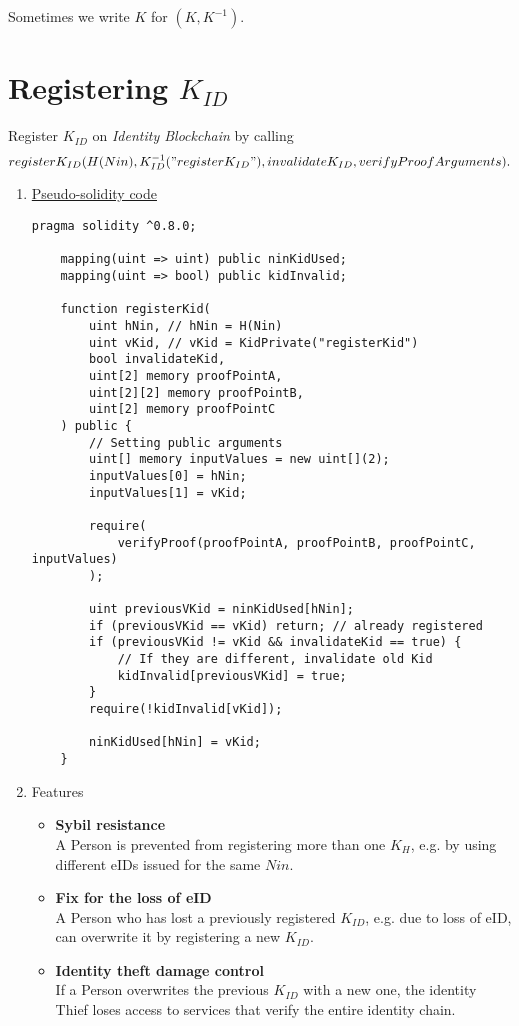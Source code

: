 \documentclass{article}
\newcommand{\khk}{K_{H}}
\newcommand{\kid}{K_{ID}}
\newcommand{\pbc}{\textit{Identity Blockchain}}
\begin{document}
Sometimes we write $K$ for $(K, K^{-1})$.

\newpage
\section{Registering $\kid$}
Register $\kid$ on \pbc{} by calling $$register\kid(H(Nin), \kid^{-1}("register\kid"), invalidate\kid, verifyProofArguments).$$
\begin{enumerate}[leftmargin=0cm]

	\item[] \underline{Pseudo-solidity code}

	\hfill\begin{minipage}{\dimexpr\textwidth-20px}
	\begin{lstlisting}[language=Solidity]
	pragma solidity ^0.8.0;
		
	mapping(uint => uint) public ninKidUsed;
	mapping(uint => bool) public kidInvalid;
	
	function registerKid(
		uint hNin, // hNin = H(Nin)
		uint vKid, // vKid = KidPrivate("registerKid")
		bool invalidateKid,
		uint[2] memory proofPointA,
		uint[2][2] memory proofPointB,
		uint[2] memory proofPointC
	) public {
		// Setting public arguments
		uint[] memory inputValues = new uint[](2);
		inputValues[0] = hNin;
		inputValues[1] = vKid;
	
		require(
			verifyProof(proofPointA, proofPointB, proofPointC, inputValues)
		);
	
		uint previousVKid = ninKidUsed[hNin];
		if (previousVKid == vKid) return; // already registered
		if (previousVKid != vKid && invalidateKid == true) {
			// If they are different, invalidate old Kid
			kidInvalid[previousVKid] = true;
		}
		require(!kidInvalid[vKid]);
	
		ninKidUsed[hNin] = vKid;
	}
	\end{lstlisting}
	\xdef\tpd{\the\prevdepth}
	\end{minipage}

	\item[] Features
    \begin{itemize}
      \item[] \textbf{Sybil resistance} \\ A Person is prevented from registering more than one $\khk$, e.g. by using different eIDs issued for the same $Nin$.
          \vspace{5px}
      \item[] \textbf{Fix for the loss of eID} \\ A Person who has lost a previously registered $\kid$, e.g. due to loss of eID, can overwrite it by registering a new $\kid$.
          \vspace{5px}
      \item[] \textbf{Identity theft damage control} \\ If a Person overwrites the previous $\kid$ with a new one, the identity Thief loses access to services that verify the entire identity chain.
    \end{itemize}


\end{enumerate}
\end{document}
